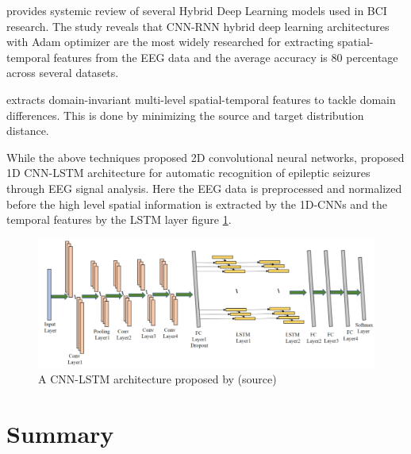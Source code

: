 \cite{2021_hDL_BCI} provides  systemic review of several Hybrid Deep Learning models used in BCI research. The study reveals that CNN-RNN hybrid deep learning architectures with Adam optimizer are the most widely researched for extracting spatial-temporal features from the EEG data and the average accuracy is 80 percentage across several datasets. 

\cite{2022_MI_DL_Multilevel} extracts domain-invariant multi-level spatial-temporal features to tackle domain differences. This is done by minimizing the source and target distribution distance.

While the above techniques proposed 2D convolutional neural networks, \cite{2020_DL_LSTM_EEG} proposed 1D CNN-LSTM architecture for automatic recognition of epileptic seizures through EEG signal analysis. Here the EEG data is preprocessed and normalized before the high level spatial information is extracted by the 1D-CNNs and the temporal features by the LSTM layer figure \ref{fig:2020_DL_LSTM_EEG_arch}.

    \begin{figure}[h] 
        \includegraphics[width=1\textwidth]{images/2020_DL_LSTM_EEG_arch.png}
        \caption{A CNN-LSTM architecture proposed by \cite{2020_DL_LSTM_EEG}(source)}
        \label{fig:2020_DL_LSTM_EEG_arch}
    \end{figure}
    
\section*{Summary}
